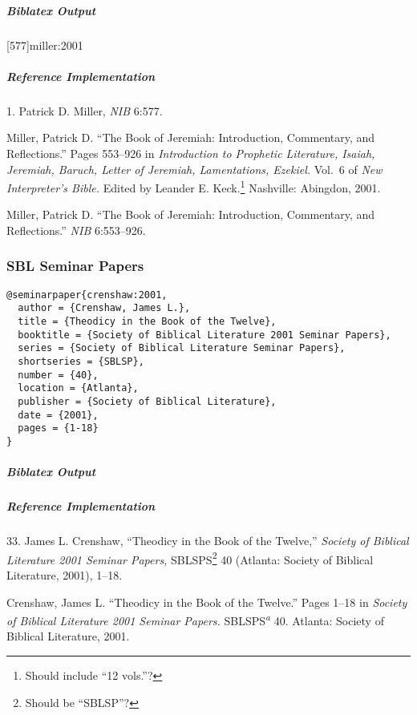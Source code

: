\documentclass[a4paper]{article}
\newenvironment{biboutput}{%
  \subparagraph{Biblatex Output}
}{\color{black}}
\newenvironment{refimp}{%
  \subparagraph{Reference Implementation}
  \color{reference-colour}
  \rm
}{\par\color{black}}
\begin{document}
\begin{biboutput}
  [577]{miller:2001}
  \toggletrue{fullbibrefs}
  \togglefalse{fullbibrefs}
\end{biboutput}

\begin{refimp}
  1. Patrick D. Miller, \emph{NIB} 6:577.

  \hangindent\bibindent Miller, Patrick D. “The Book of Jeremiah:
  Introduction, Commentary, and Reflections.” Pages 553–926 in
  \emph{Introduction to Prophetic Literature, Isaiah, Jeremiah, Baruch, Letter
  of Jeremiah, Lamentations, Ezekiel.} Vol.~6 of \emph{New Interpreter’s
  Bible.} Edited by Leander E. Keck.\footnote{Should include “12 vols.”?}
  Nashville: Abingdon, 2001.

  \hangindent\bibindent Miller, Patrick D. “The Book of Jeremiah:
  Introduction, Commentary, and Reflections.” \emph{NIB} 6:553–926.

\end{refimp}

\subsubsection{SBL Seminar Papers}

\begin{lstlisting}
@seminarpaper{crenshaw:2001,
  author = {Crenshaw, James L.},
  title = {Theodicy in the Book of the Twelve},
  booktitle = {Society of Biblical Literature 2001 Seminar Papers},
  series = {Society of Biblical Literature Seminar Papers},
  shortseries = {SBLSP},
  number = {40},
  location = {Atlanta},
  publisher = {Society of Biblical Literature},
  date = {2001},
  pages = {1-18}
}
\end{lstlisting}

\begin{biboutput}
\end{biboutput}

\begin{refimp}
  33. James L. Crenshaw, “Theodicy in the Book of the Twelve,” \emph{Society
  of Biblical Literature 2001 Seminar Papers,} SBLSPS\footnote{Should be
  “SBLSP”?} 40 (Atlanta: Society of Biblical Literature, 2001), 1–18.
  
  \hangindent\bibindent Crenshaw, James L. “Theodicy in the Book of the
  Twelve.” Pages 1–18 in \emph{Society of Biblical Literature 2001 Seminar
  Papers.} SBLSPS\textsuperscript{\emph{a}} 40. Atlanta: Society of Biblical
  Literature, 2001.

\end{refimp}
\end{document}

